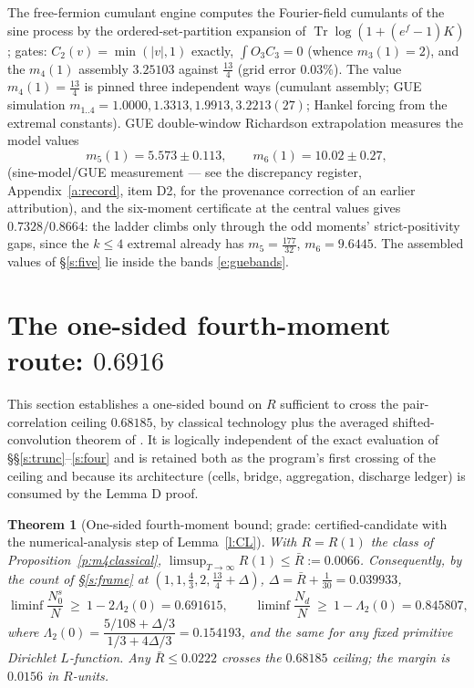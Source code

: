 \documentclass[11pt]{article}
\numberwithin{equation}{section}
\newtheorem{theorem}{Theorem}[section]
\theoremstyle{definition}
\theoremstyle{remark}
\begin{document}
The free-fermion cumulant engine computes the Fourier-field
cumulants of the sine process by the ordered-set-partition
expansion of $\operatorname{Tr}\log(1+(e^f-1)K)$; gates:
$C_2(v)=\min(|v|,1)$ exactly, $\int O_3C_3=0$ (whence $m_3(1)=2$),
and the $m_4(1)$ assembly $3.25103$ against $\tfrac{13}4$ (grid
error $0.03\%$). The value $m_4(1)=\tfrac{13}4$ is pinned three
independent ways (cumulant assembly; GUE simulation
$m_{1..4}=1.0000,1.3313,1.9913,3.2213(27)$; Hankel forcing from
the extremal constants). GUE double-window Richardson
extrapolation measures the model values
\begin{equation}\label{e:guebands}
m_5(1)=5.573\pm0.113,\qquad m_6(1)=10.02\pm0.27,
\end{equation}
(sine-model/GUE measurement --- see the discrepancy register,
Appendix~\ref{a:record}, item D2, for the provenance correction
of an earlier attribution), and the six-moment certificate at the
central values gives $0.7328/0.8664$: the ladder climbs only
through the odd moments' strict-positivity gaps, since the
$k\le4$ extremal already has $m_5=\tfrac{177}{32}$,
$m_6=9.6445$. The assembled values of \S\ref{s:five} lie inside
the bands \eqref{e:guebands}.

\section{The one-sided fourth-moment route:
$0.6916$}\label{s:fm}

This section establishes a one-sided bound on $R$ sufficient to
cross the pair-correlation ceiling $0.68185$, by classical
technology plus the averaged shifted-convolution theorem of
\cite{MRT}. It is logically
independent of the exact evaluation of
\S\S\ref{s:trunc}--\ref{s:four} and is retained both as the
program's first crossing of the ceiling and because its
architecture (cells, bridge, aggregation, discharge ledger) is
consumed by the Lemma D proof.

\begin{theorem}[One-sided fourth-moment bound; grade:
certified-candidate with the numerical-analysis step of
Lemma~\ref{l:CL}]\label{t:fm}
With $R=R(1)$ the class of Proposition~\ref{p:m4classical},
$\limsup_{T\to\infty}R(1)\le\bar R:=0.0066$. Consequently, by the
count of \S\ref{s:frame} at
$(1,1,\tfrac43,2,\tfrac{13}4+\Delta)$, $\Delta=\bar R+\tfrac1{30}
=0.039933$,
\[
\liminf\frac{N_0^{s}}{N}\ \ge\ 1-2\Lambda_2(0)=0.691615,
\qquad
\liminf\frac{N_d}{N}\ \ge\ 1-\Lambda_2(0)=0.845807,
\]
where $\Lambda_2(0)=\dfrac{5/108+\Delta/3}{1/3+4\Delta/3}
=0.154193$, and the same for any fixed primitive Dirichlet
$L$-function. Any $\bar R\le0.0222$ crosses the $0.68185$
ceiling; the margin is $0.0156$ in $R$-units.
\end{theorem}
\end{document}
